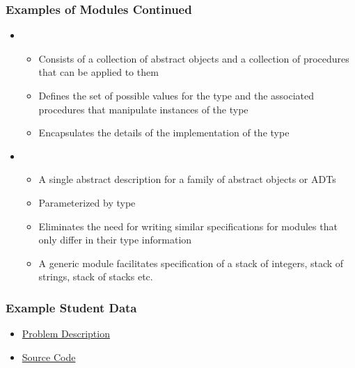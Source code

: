 \documentclass[t,12pt,numbers,fleqn,handout]{beamer}
\begin{document}
\begin{frame}
\frametitle{Examples of Modules Continued}

\begin{itemize}

\item {}
\begin{itemize}
\item Consists of a collection of abstract objects and a collection of
  procedures that can be applied to them
\item Defines the set of possible values for the type and the associated
  procedures that manipulate instances of the type
\item Encapsulates the details of the implementation of the type
\end{itemize}
\item {}
\begin{itemize}
\item A single abstract description for a family of abstract objects or ADTs
\item Parameterized by type
\item Eliminates the need for writing similar specifications for modules that
  only differ in their type information
\item A generic module facilitates specification of a stack of integers, stack
  of strings, stack of stacks etc.
\end{itemize}

\end{itemize}

\end{frame}


\begin{frame}
\frametitle{Example Student Data}
\begin{itemize}
\item
  \href{https://gitlab.cas.mcmaster.ca/smiths/se2aa4_cs2me3/blob/master/Assignments/A2/A2.pdf}
  {Problem Description}
\item
  \href{https://gitlab.cas.mcmaster.ca/smiths/se2aa4_cs2me3/tree/master/Assignments/A2/A2Soln/src}
  {Source Code}
\end{itemize}
\end{frame}

\end{document}
